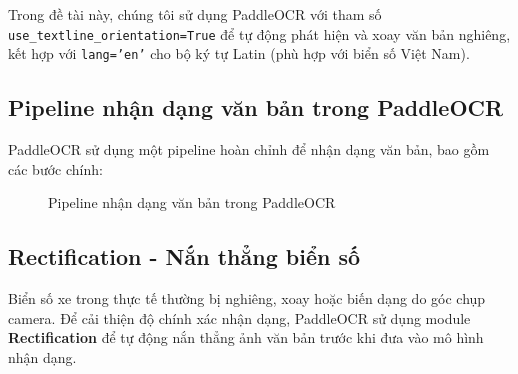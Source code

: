 Trong đề tài này, chúng tôi sử dụng PaddleOCR với tham số \texttt{use\_textline\_orientation=True} để tự động phát hiện và xoay văn bản nghiêng, kết hợp với \texttt{lang='en'} cho bộ ký tự Latin (phù hợp với biển số Việt Nam).

\subsection{Pipeline nhận dạng văn bản trong PaddleOCR}

PaddleOCR sử dụng một pipeline hoàn chỉnh để nhận dạng văn bản, bao gồm các bước chính:

\begin{figure}[!htbp]
    \centering
    \caption{Pipeline nhận dạng văn bản trong PaddleOCR}
    \label{fig:paddleocr_pipeline}
\end{figure}

\subsection{Rectification - Nắn thẳng biển số}

Biển số xe trong thực tế thường bị nghiêng, xoay hoặc biến dạng do góc chụp camera. Để cải thiện độ chính xác nhận dạng, PaddleOCR sử dụng module \textbf{Rectification} để tự động nắn thẳng ảnh văn bản trước khi đưa vào mô hình nhận dạng.

